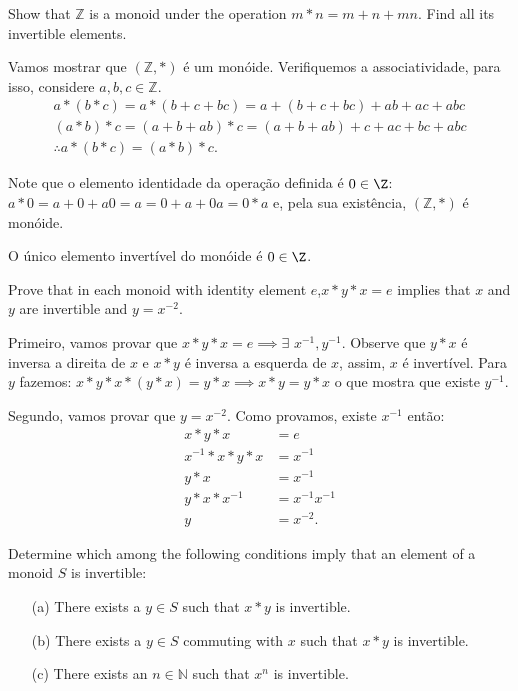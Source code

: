 \begin{exercicio}{1.43}
	Show that $\mathbb{Z}$ is a monoid under the operation $m * n = m + n + mn$. Find all
	its invertible elements.
\end{exercicio}

\begin{solucao}
	Vamos mostrar que $(\mathbb{Z}, *)$ é um monóide. Verifiquemos a associatividade, para isso, considere \(a, b, c \in \mathbb{Z}\).
	\begin{gather*}
		a * (b * c) = a * (b + c + bc) = a + (b + c + bc) + ab + ac + abc \\ 
		(a*b)*c = (a + b + ab) * c = (a + b + ab) + c + ac + bc + abc \\
		\therefore a * (b * c) = (a*b)*c.
	\end{gather*}

	Note que o elemento identidade da operação definida é \(0 \in \Z\): \(a * 0 = a + 0 + a0 = a = 0 + a + 0a = 0 * a\) e, pela sua existência, $(\mathbb{Z}, *)$ é monóide.

	O único elemento invertível do monóide é \(0 \in \Z\).
\end{solucao}

\begin{exercicio}{1.44}
	Prove that in each monoid with identity element $e$,$x * y * x = e$ implies that $x$ and $y$ are invertible and $y = x^{-2}$.
\end{exercicio}

\begin{solucao}
	Primeiro, vamos provar que $x*y*x = e \implies \exists \, \, x^{-1}, y^{-1}$. Observe que \(y * x\) é inversa a direita de $x$ e \(x * y\) é inversa a esquerda de \(x\), assim, \(x\) é invertível. Para \(y\) fazemos: \(x * y * x * (y * x) = y * x \implies x * y = y * x\) o que mostra que existe $y^{-1}$.

	Segundo, vamos provar que $y = x^{-2}$. Como provamos, existe $x^{-1}$ então:
	\begin{align*}
		x * y * x &= e \\
		x^{-1} * x * y * x &= x^{-1} \\
		y * x &= x^{-1} \\
		y * x * x^{-1} &= x^{-1}x^{-1} \\
		y &= x^{-2}. 
	\end{align*}
\end{solucao}

\begin{exercicio}{1.45}
	Determine which among the following conditions imply that an element of a
	monoid \( S \) is invertible:
	\begin{itemize}
		\item[(a)] There exists a \( y \in S \) such that \( x * y \) is invertible.
		\item[(b)] There exists a \( y \in S \) commuting with \( x \) such that \( x * y \) is invertible.
		\item[(c)] There exists an \( n \in \mathbb{N} \) such that \( x^n \) is invertible.
	\end{itemize}
\end{exercicio}

